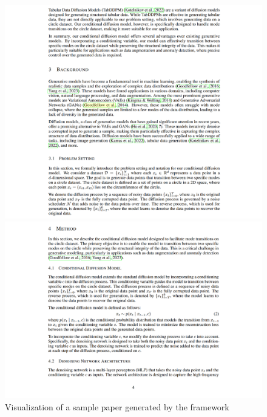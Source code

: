 \begin{figure}[t]
\begin{minipage}{0.48\textwidth}
    \end{minipage}
    \\
    \vspace{2cm}
    \centering
    \begin{minipage}{0.48\textwidth}
        \includegraphics[width=1\textwidth]{images/paper3.png}
    \end{minipage}
    \hfill 
    \begin{minipage}{0.48\textwidth}
        \includegraphics[width=1\textwidth]{images/paper4.png}
    \end{minipage}
    \caption{Visualization of a sample paper generated by the framework}
\end{figure}

